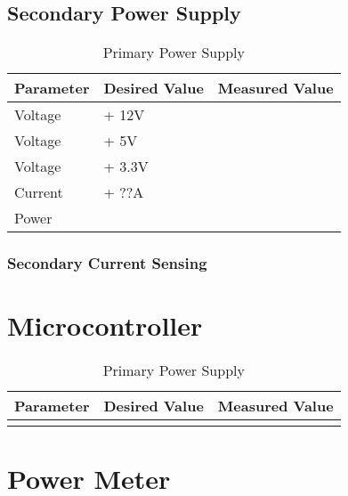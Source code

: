 \subsection{Secondary Power Supply}
\label{subsec: Secondary Power Supply}

\begin{table}[H]
  \centering
  \begin{tabular}{|l|l|l|}
    \hline
    \textbf{Parameter}    &  \textbf{Desired Value}   &  \textbf{Measured Value}  \\
    \hline
    Voltage  & + 12V   & \\
    \hline
    Voltage  & + 5V    & \\
    \hline
    Voltage  & + 3.3V  & \\
    \hline
    Current  & + ??A   & \\
    \hline
    Power    &         & \\
    \hline
  \end{tabular}
  \caption{Primary Power Supply}
  \label{tab: Primary Power Supply}
\end{table}

\subsubsection{Secondary Current Sensing}
\label{subsubsec: Secondary Current Sensing}


\section{Microcontroller}
\label{sec: Microcontroller}
\begin{table}[H]
  \centering
  \begin{tabular}{|l|l|l|}
    \hline
    \textbf{Parameter}    &  \textbf{Desired Value}   &  \textbf{Measured Value}  \\
    \hline
      &    & \\
    \hline
  \end{tabular}
  \caption{Primary Power Supply}
  \label{tab: Primary Power Supply}
\end{table}


\section{Power Meter}
\label{sec: Power Meter}
